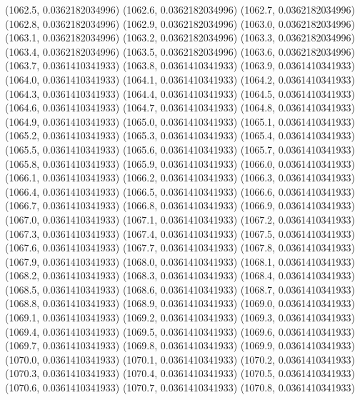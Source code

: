 {					(1062.5, 0.0362182034996)
					(1062.6, 0.0362182034996)
					(1062.7, 0.0362182034996)
					(1062.8, 0.0362182034996)
					(1062.9, 0.0362182034996)
					(1063.0, 0.0362182034996)
					(1063.1, 0.0362182034996)
					(1063.2, 0.0362182034996)
					(1063.3, 0.0362182034996)
					(1063.4, 0.0362182034996)
					(1063.5, 0.0362182034996)
					(1063.6, 0.0362182034996)
					(1063.7, 0.0361410341933)
					(1063.8, 0.0361410341933)
					(1063.9, 0.0361410341933)
					(1064.0, 0.0361410341933)
					(1064.1, 0.0361410341933)
					(1064.2, 0.0361410341933)
					(1064.3, 0.0361410341933)
					(1064.4, 0.0361410341933)
					(1064.5, 0.0361410341933)
					(1064.6, 0.0361410341933)
					(1064.7, 0.0361410341933)
					(1064.8, 0.0361410341933)
					(1064.9, 0.0361410341933)
					(1065.0, 0.0361410341933)
					(1065.1, 0.0361410341933)
					(1065.2, 0.0361410341933)
					(1065.3, 0.0361410341933)
					(1065.4, 0.0361410341933)
					(1065.5, 0.0361410341933)
					(1065.6, 0.0361410341933)
					(1065.7, 0.0361410341933)
					(1065.8, 0.0361410341933)
					(1065.9, 0.0361410341933)
					(1066.0, 0.0361410341933)
					(1066.1, 0.0361410341933)
					(1066.2, 0.0361410341933)
					(1066.3, 0.0361410341933)
					(1066.4, 0.0361410341933)
					(1066.5, 0.0361410341933)
					(1066.6, 0.0361410341933)
					(1066.7, 0.0361410341933)
					(1066.8, 0.0361410341933)
					(1066.9, 0.0361410341933)
					(1067.0, 0.0361410341933)
					(1067.1, 0.0361410341933)
					(1067.2, 0.0361410341933)
					(1067.3, 0.0361410341933)
					(1067.4, 0.0361410341933)
					(1067.5, 0.0361410341933)
					(1067.6, 0.0361410341933)
					(1067.7, 0.0361410341933)
					(1067.8, 0.0361410341933)
					(1067.9, 0.0361410341933)
					(1068.0, 0.0361410341933)
					(1068.1, 0.0361410341933)
					(1068.2, 0.0361410341933)
					(1068.3, 0.0361410341933)
					(1068.4, 0.0361410341933)
					(1068.5, 0.0361410341933)
					(1068.6, 0.0361410341933)
					(1068.7, 0.0361410341933)
					(1068.8, 0.0361410341933)
					(1068.9, 0.0361410341933)
					(1069.0, 0.0361410341933)
					(1069.1, 0.0361410341933)
					(1069.2, 0.0361410341933)
					(1069.3, 0.0361410341933)
					(1069.4, 0.0361410341933)
					(1069.5, 0.0361410341933)
					(1069.6, 0.0361410341933)
					(1069.7, 0.0361410341933)
					(1069.8, 0.0361410341933)
					(1069.9, 0.0361410341933)
					(1070.0, 0.0361410341933)
					(1070.1, 0.0361410341933)
					(1070.2, 0.0361410341933)
					(1070.3, 0.0361410341933)
					(1070.4, 0.0361410341933)
					(1070.5, 0.0361410341933)
					(1070.6, 0.0361410341933)
					(1070.7, 0.0361410341933)
					(1070.8, 0.0361410341933)
}
